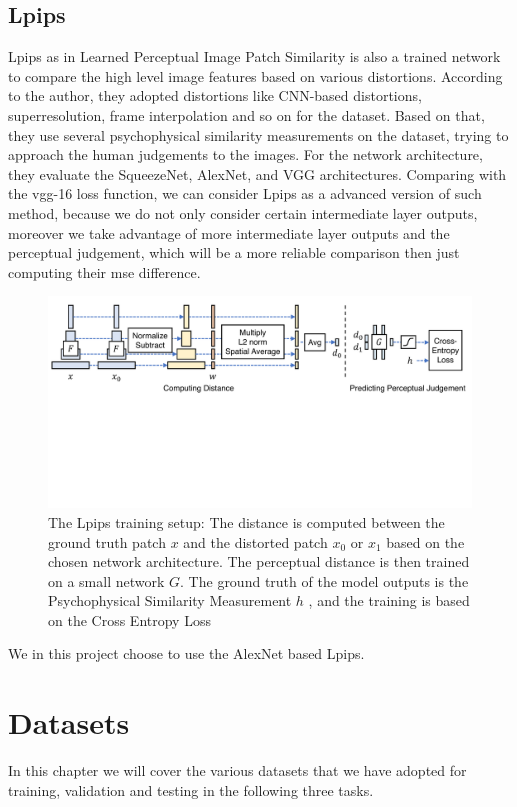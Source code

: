 \documentclass[a4paper,12pt,twoside]{report}
\begin{document}
\section{Lpips}
Lpips as in Learned Perceptual Image Patch Similarity\cite{zhang2018perceptual} is also a trained network to compare the high level image features based on various distortions. According to the author, they adopted distortions like CNN-based distortions, superresolution, frame interpolation and so on for the dataset. Based on that, they use several psychophysical similarity measurements on the dataset, trying to approach the human judgements to the images. For the network architecture, they evaluate the SqueezeNet, AlexNet, and VGG architectures. Comparing with the vgg-16 loss function, we can consider Lpips as a advanced version of such method, because we do not only consider certain intermediate layer outputs, moreover we take advantage of more intermediate layer outputs and the perceptual judgement, which will be a more reliable comparison then just computing their mse difference.
\begin{figure}
\centering
\includegraphics[width=1.0\textwidth]{network_lpips.pdf}
\caption{The Lpips training setup: The distance is computed between the ground truth patch $x$ and the distorted patch $x_0$ or $x_1$ based on the chosen network architecture. The perceptual distance is then trained on a small network $G$. The ground truth of the model outputs is the Psychophysical Similarity Measurement $h$ , and the training is based on the Cross Entropy Loss\cite{zhang2018perceptual}}
\end{figure}
We in this project choose to use the AlexNet based Lpips.







\chapter{Datasets}
In this chapter we will cover the various datasets that we have adopted for training, validation and testing in the following three tasks.
\end{document}
